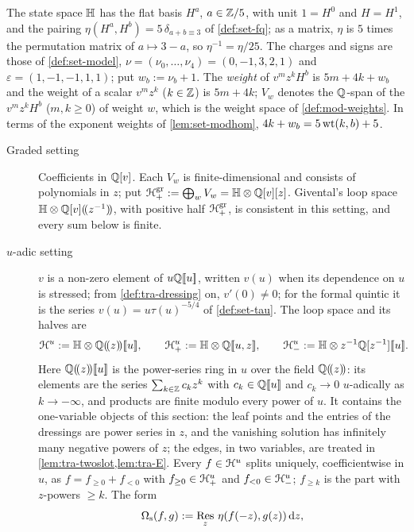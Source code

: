 \begin{conv}
\label{conv:tra-forms}
The state space $\mathbb{H}$ has the flat basis $H^a$, $a\in\mathbb{Z}/5$, with unit $1 = H^0$ and $H = H^1$, and the pairing $\eta(H^a,H^b) = 5\,\delta_{a+b\equiv 3}$ of \cref{def:set-fq}; as a matrix, $\eta$ is $5$ times the permutation matrix of $a\mapsto 3-a$, so $\eta^{-1} = \eta/25$. The charges and signs are those of \cref{def:set-model}, $\nu = (\nu_0,\dots,\nu_4) = (0,-1,3,2,1)$ and $\varepsilon = (1,-1,-1,1,1)$; put $w_b := \nu_b+1$. The \emph{weight} of $v^mz^kH^b$ is $5m+4k+w_b$ and the weight of a scalar $v^mz^k$ ($k\in\mathbb{Z}$) is $5m+4k$; $V_w$ denotes the $\mathbb{Q}$-span of the $v^mz^kH^b$ ($m,k\geq 0$) of weight $w$, which is the weight space of \cref{def:mod-weights}. In terms of the exponent weights of \cref{lem:set-modhom}, $4k+w_b = 5\operatorname{wt}(k,b)+5$.
\begin{description}
\item[Graded setting] Coefficients in $\mathbb{Q}[v]$. Each $V_w$ is finite-dimensional and consists of polynomials in $z$; put $\mathcal{H}^{\mathrm{gr}}_+ := \bigoplus_wV_w = \mathbb{H}\otimes\mathbb{Q}[v][z]$. Givental's loop space $\mathbb{H}\otimes\mathbb{Q}[v](\!(z^{-1})\!)$, with positive half $\mathcal{H}^{\mathrm{gr}}_+$, is consistent in this setting, and every sum below is finite.
\item[$u$-adic setting] $v$ is a non-zero element of $u\mathbb{Q}[\![ u ]\!]$, written $v(u)$ when its dependence on $u$ is stressed; from \cref{def:tra-dressing} on, $v'(0)\neq 0$; for the formal quintic it is the series $v(u) = u\tau(u)^{-5/4}$ of \cref{def:set-tau}. The loop space and its halves are
\[
\cH^u := \bbH\otimes\bbQ\lser{z}\fps{u},\qquad \cH^u_+ := \bbH\otimes\bbQ\fps{u,z},\qquad \cH^u_- := \bbH\otimes z^{-1}\bbQ[z^{-1}]\fps{u}.
\]
Here $\mathbb{Q}(\!(z)\!)[\![ u ]\!]$ is the power-series ring in $u$ over the field $\mathbb{Q}(\!(z)\!)$: its elements are the series $\sum_{k\in\mathbb{Z}}c_kz^k$ with $c_k\in\mathbb{Q}[\![ u ]\!]$ and $c_k\to 0$ $u$-adically as $k\to-\infty$, and products are finite modulo every power of $u$. It contains the one-variable objects of this section: the leaf points and the entries of the dressings are power series in $z$, and the vanishing solution has infinitely many negative powers of $z$; the edges, in two variables, are treated in \cref{lem:tra-twoslot,lem:tra-E}. Every $f\in\mathcal{H}^u$ splits uniquely, coefficientwise in $u$, as $f = f_{\geq 0}+f_{<0}$ with $f_{\geq 0}\in\mathcal{H}^u_+$ and $f_{<0}\in\mathcal{H}^u_-$; $f_{\geq k}$ is the part with $z$-powers $\geq k$. The form
\[
\Omega_{\mathrm s}(f,g) := \operatorname*{Res}_z\,\eta(f(-z),g(z))\,\mathrm{d} z,
\]
\end{description}
\end{conv}
